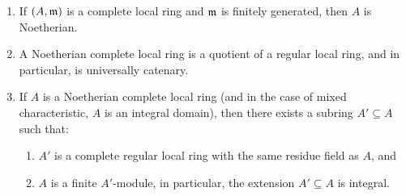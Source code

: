 \begin{theorem}
\begin{enumerate}[label=(\arabic*)]
    \item If $(A,\mathfrak{m})$ is a complete local ring and $\mathfrak{m}$ is finitely generated, then $A$ is Noetherian. 
    \item A Noetherian complete local ring is a quotient of a regular local ring, and in particular, is universally catenary.
    \item If $A$ is a Noetherian complete local ring (and in the case of mixed characteristic, $A$ is an integral domain), then there exists a subring $A'\subseteq A$ such that: 
    \begin{enumerate}[label=(\roman*)]
        \item $A'$ is a complete regular local ring with the same residue field as $A$, and 
        \item $A$ is a finite $A'$-module, in particular, the extension $A'\subseteq A$ is integral.
    \end{enumerate}
\end{enumerate}
\end{theorem}

